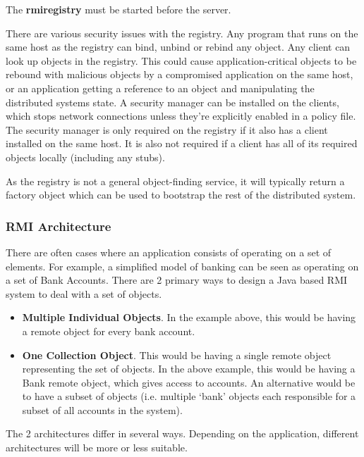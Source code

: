 \documentclass{article}
\begin{document}
The \textbf{rmiregistry} must be started before the server. 

There are various security issues with the registry. Any program that runs on the same host as the registry can bind, unbind or rebind any object. Any client can look up objects in the registry. This could cause application-critical objects to be rebound with malicious objects by a compromised application on the same host, or an application getting a reference to an object and manipulating the distributed systems state. A security manager can be installed on the clients, which stops network connections unless they're explicitly enabled in a policy file. The security manager is only required on the registry if it also has a client installed on the same host. It is also not required if a client has all of its required objects locally (including any stubs). 

As the registry is not a general object-finding service, it will typically return a factory object which can be used to bootstrap the rest of the distributed system. 

\subsubsection{RMI Architecture}
There are often cases where an application consists of operating on a set of elements. For example, a simplified model of banking can be seen as operating on a set of Bank Accounts. There are 2 primary ways to design a Java based RMI system to deal with a set of objects.

\begin{itemize}
    \item \textbf{Multiple Individual Objects}. In the example above, this would be having a remote object for every bank account. 
    \item \textbf{One Collection Object}. This would be having a single remote object representing the set of objects. In the above example, this would be having a Bank remote object, which gives access to accounts. An alternative would be to have a subset of objects (i.e. multiple `bank' objects each responsible for a subset of all accounts in the system).
\end{itemize}

The 2 architectures differ in several ways. Depending on the application, different architectures will be more or less suitable. 
\end{document}
